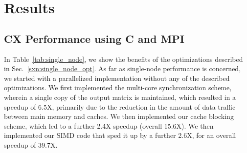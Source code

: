 \section{Results}
\label{sec:results}



\subsection{CX Performance using C and MPI} %
  \label{sxn:results1}


   

In Table~\ref{tab:single_node}, we show the benefits of the
      optimizations described in
      Sec.~\ref{sxn:single_node_opt}. 
      As far as single-node performance is concerned, we started with a parallelized implementation  
      without any of the described optimizations. %
      We first implemented the multi-core synchronization scheme, wherein a single copy of the
      output matrix is maintained, %
      which resulted in a speedup of 6.5X, primarily due to
      the reduction in the amount of data traffic between 
      main memory and caches. 
      We then implemented our cache blocking scheme, which led to a
      further  2.4X speedup (overall 15.6X).
      We then implemented our SIMD code that sped it up by a further
      2.6X, for an overall speedup of 39.7X. 






